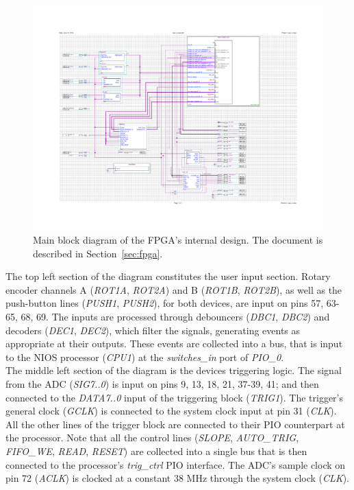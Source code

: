 \documentclass[titlepage]{scrartcl}
\begin{document}
	\begin{figure}[h!]
	\vspace{-4cm}
	\centerline{\includegraphics[width=30cm, angle=90, origin=c]{img/quartus_main.pdf}}
		\vspace{-2cm}
                	\caption{Main block diagram of the FPGA's internal design. The document is described in Section~\ref{sec:fpga}.}
               	\label{fig:quartus_main}
	\end{figure}

	The top left section of the diagram constitutes the user input section. Rotary encoder channels A (\textit{ROT1A}, \textit{ROT2A}) and B (\textit{ROT1B}, \textit{ROT2B}), as well as the push-button lines (\textit{PUSH1}, \textit{PUSH2}), for both devices, are input on pins 57, 63-65, 68, 69. The inputs are processed through debouncers (\textit{DBC1}, \textit{DBC2}) and decoders (\textit{DEC1}, \textit{DEC2}), which filter the signals, generating events as appropriate at their outputs. These events are collected into a bus, that is input to the NIOS processor (\textit{CPU1}) at the \textit{switches\_in} port of \textit{PIO\_0}.\\

	The middle left section of the diagram is the devices triggering logic. The signal from the ADC (\textit{SIG7..0}) is input on pins 9, 13, 18, 21, 37-39, 41; and then connected to the \textit{DATA7..0} input of the triggering block (\textit{TRIG1}). The trigger's general clock (\textit{GCLK}) is connected to the system clock input at pin 31 (\textit{CLK}). All the other lines of the trigger block are connected to their PIO counterpart at the processor. Note that all the control lines (\textit{SLOPE}, \textit{AUTO\_TRIG}, \textit{FIFO\_WE}, \textit{READ}, \textit{RESET}) are collected into a single bus that is then connected to the processor's \textit{trig\_ctrl} PIO interface. The ADC's sample clock on pin 72 (\textit{ACLK}) is clocked at a constant 38 MHz through the system clock (\textit{CLK}).\\
\end{document}

